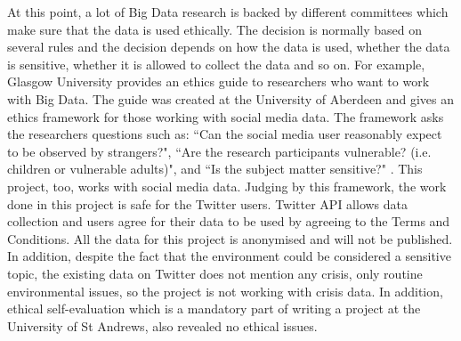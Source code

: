 At this point, a lot of Big Data research is backed by different committees which make sure that the data is used ethically. The decision is normally based on several rules and the decision depends on how the data is used, whether the data is sensitive, whether it is allowed to collect the data and so on. For example, Glasgow University provides an ethics guide to researchers who want to work with Big Data. The guide was created at the University of Aberdeen and gives an ethics framework for those working with social media data. The framework asks the researchers questions such as: ``Can the social media user reasonably expect to be observed by strangers?", ``Are the research participants vulnerable? (i.e. children or vulnerable adults)", and ``Is the subject matter sensitive?" \cite{ethicsguide}. 
This project, too, works with social media data. Judging by this framework, the work done in this project is safe for the Twitter users. Twitter API allows data collection and users agree for their data to be used by agreeing to the Terms and Conditions. All the data for this project is anonymised and will not be published. In addition, despite the fact that the environment could be considered a sensitive topic, the existing data on Twitter does not mention any crisis, only routine environmental issues, so the project is not working with crisis data. In addition, ethical self-evaluation which is a mandatory part of writing a project at the University of St Andrews, also revealed no ethical issues. 

